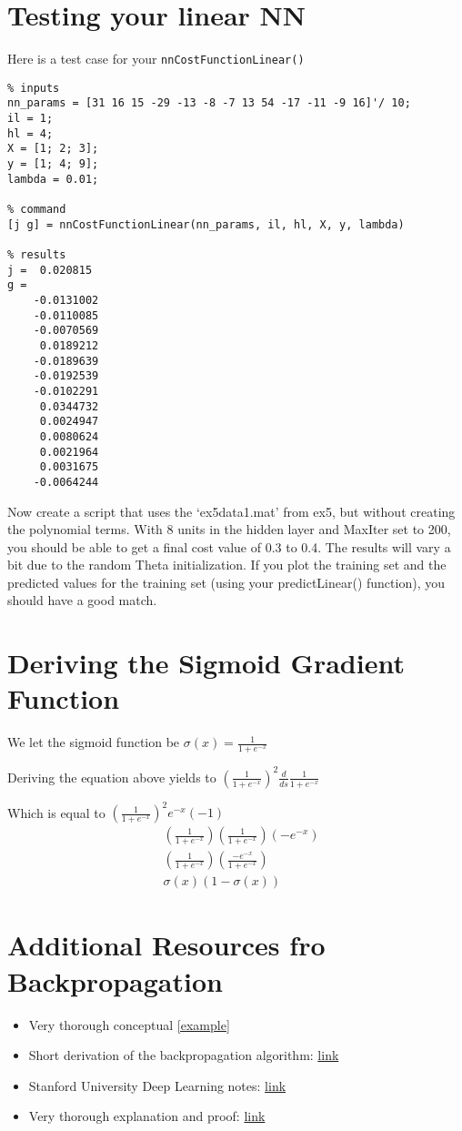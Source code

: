 \section{Testing your linear NN}
Here is a test case for your \verb|nnCostFunctionLinear()|
\begin{verbatim}
% inputs
nn_params = [31 16 15 -29 -13 -8 -7 13 54 -17 -11 -9 16]'/ 10;
il = 1;
hl = 4;
X = [1; 2; 3];
y = [1; 4; 9];
lambda = 0.01;

% command
[j g] = nnCostFunctionLinear(nn_params, il, hl, X, y, lambda)

% results
j =  0.020815
g =
    -0.0131002
    -0.0110085
    -0.0070569
     0.0189212
    -0.0189639
    -0.0192539
    -0.0102291
     0.0344732
     0.0024947
     0.0080624
     0.0021964
     0.0031675
    -0.0064244
\end{verbatim}
Now create a script that uses the `ex5data1.mat' from ex5, but without creating the polynomial terms. With 8 units in the hidden layer and MaxIter set to 200, you should be able to get a final cost value of 0.3 to 0.4. The results will vary a bit due to the random Theta initialization. If you plot the training set and the predicted values for the training set (using your predictLinear() function), you should have a good match.
\section{Deriving the Sigmoid Gradient Function}
We let the sigmoid function be $\sigma(x) = \frac{1}{1 + e^{-x}}$

Deriving the equation above yields to $(\frac{1}{1 + e^{-x}})^2 \frac {d}{ds} \frac{1}{1 + e^{-x}}$

Which is equal to $(\frac{1}{1 + e^{-x}})^2 e^{-x} (-1)$
\begin{align*}
&(\frac{1}{1 + e^{-x}}) (\frac{1}{1 + e^{-x}}) (-e^{-x})\\
&(\frac{1}{1 + e^{-x}}) (\frac{-e^{-x}}{1 + e^{-x}}) \\
&\sigma(x)(1- \sigma(x))
\end{align*}

\section{Additional Resources fro Backpropagation}
\begin{itemize}
\item Very thorough conceptual \href{https://web.archive.org/web/20150317210621/https://www4.rgu.ac.uk/files/chapter3%20-%20bp.pdf}{[example]}
\item Short derivation of the backpropagation algorithm: \href{http://pandamatak.com/people/anand/771/html/node37.html}{link}
\item Stanford University Deep Learning notes: \href{http://ufldl.stanford.edu/wiki/index.php/Backpropagation_Algorithm}{link}
\item Very thorough explanation and proof: \href{http://neuralnetworksanddeeplearning.com/chap2.html}{link}
\end{itemize}
